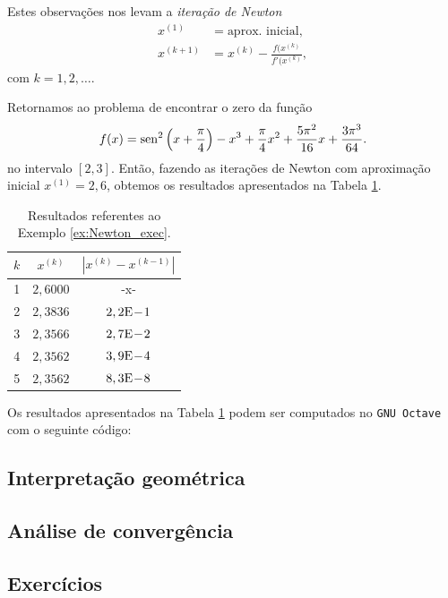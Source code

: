 Estes observações nos levam a \emph{iteração de Newton}
\begin{align}
  x^{(1)} &= \text{aprox. inicial},\\
  x^{(k+1)} &= x^{(k)} - \frac{f(x^{(k)}}{f'(x^{(k)}},
\end{align}
com $k=1, 2, \ldots$.

\begin{ex}\label{ex:Newton_exec}
  Retornamos ao problema de encontrar o zero da função
  \begin{equation}
    f(x) = \operatorname{sen}^2\left(x+\frac{\pi}{4}\right) - x^3 + \frac{\pi}{4}x^2 + \frac{5\pi^2}{16}x + \frac{3\pi^3}{64}.
  \end{equation}
  no intervalo $[2,3]$. Então, fazendo as iterações de Newton com aproximação inicial $x^{(1)}=2,6$, obtemos os resultados apresentados na Tabela \ref{tab:ex_Newton_exec}.

\begin{table}[h!]
  \centering
  \begin{tabular}{r|cc}
    $k$ & $x^{(k)}$ & $|x^{(k)}-x^{(k-1)}|$ \\\hline
    1 & $2,6000$ & -x-\\
    2 & $2,3836$ & $2,2\mathrm{E}\!-\!1$ \\
    3 & $2,3566$ & $2,7\mathrm{E}\!-\!2$ \\
    4 & $2,3562$ & $3,9\mathrm{E}\!-\!4$ \\
    5 & $2,3562$ & $8,3\mathrm{E}\!-\!8$ \\\hline
  \end{tabular}
  \caption{Resultados referentes ao Exemplo \ref{ex:Newton_exec}.}
  \label{tab:ex_Newton_exec}
\end{table}

\ifisoctave
Os resultados apresentados na Tabela \ref{tab:ex_Newton_exec} podem ser computados no \verb+GNU Octave+ com o seguinte código:

\fi
\end{ex}


\subsection{Interpretação geométrica}

\emconstrucao

\subsection{Análise de convergência}

\emconstrucao

\subsection*{Exercícios}

\emconstrucao
